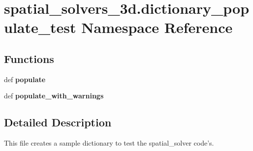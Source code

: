 \hypertarget{namespacespatial__solvers__3d_1_1dictionary__populate__test}{\section{spatial\+\_\+solvers\+\_\+3d.\+dictionary\+\_\+populate\+\_\+test Namespace Reference}
\label{namespacespatial__solvers__3d_1_1dictionary__populate__test}
}
\subsection*{Functions}
\begin{DoxyCompactItemize}
\item 
\hypertarget{namespacespatial__solvers__3d_1_1dictionary__populate__test_a872f88445af5d0a77c04197deafd8867}{def {\bfseries populate}}\label{namespacespatial__solvers__3d_1_1dictionary__populate__test_a872f88445af5d0a77c04197deafd8867}

\item 
\hypertarget{namespacespatial__solvers__3d_1_1dictionary__populate__test_a13310225824b294394bf44daf491412e}{def {\bfseries populate\+\_\+with\+\_\+warnings}}\label{namespacespatial__solvers__3d_1_1dictionary__populate__test_a13310225824b294394bf44daf491412e}

\end{DoxyCompactItemize}


\subsection{Detailed Description}
\begin{DoxyVerb}This file creates a sample dictionary to test the spatial_solver code's.\end{DoxyVerb}
 
